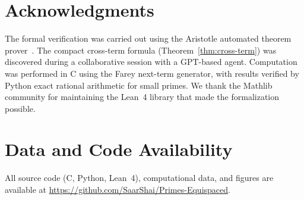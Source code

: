 \documentclass[11pt]{article}
\theoremstyle{definition}
\begin{document}
\section*{Acknowledgments}

The formal verification was carried out using the Aristotle
automated theorem prover~\cite{Aristotle2025}.  The compact
cross-term formula (Theorem~\ref{thm:cross-term}) was discovered
during a collaborative session with a GPT-based agent.
Computation was performed in C using the Farey next-term
generator, with results verified by Python exact rational
arithmetic for small primes.  We thank the Mathlib community
for maintaining the Lean~4 library that made the formalization
possible.


\section*{Data and Code Availability}

All source code (C, Python, Lean~4), computational data, and
figures are available at
\url{https://github.com/SaarShai/Primes-Equispaced}.

\end{document}
